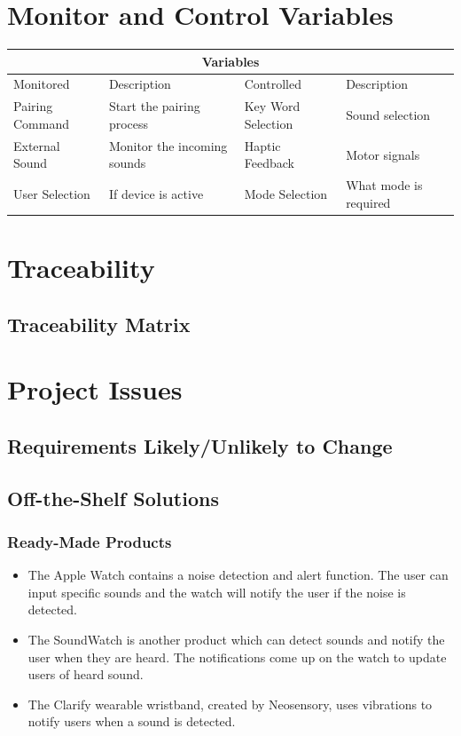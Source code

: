 \documentclass[12pt]{article}
\begin{document}
\section{Monitor and Control Variables}

\center

\begin{tabular}{|p{3cm}|p{3cm}|p{6cm}|p{3cm}| }
 \hline
 \multicolumn{4}{|c|}{Variables} \\
 \hline
 Monitored& Description & Controlled & Description\\
 \hline
 Pairing Command  &  Start the pairing process  & Key Word Selection & Sound selection  \\
 \hline
External Sound &  Monitor the incoming sounds & Haptic Feedback & Motor signals \\
\hline
User Selection & If device is active & Mode Selection & What mode is required \\
\hline


\end{tabular}

\raggedright

\section{Traceability}
 	
\subsection{Traceability Matrix}

\section{Project Issues}

\subsection{Requirements Likely/Unlikely to Change}

\subsection{Off-the-Shelf Solutions} 

\subsubsection{Ready-Made Products}
\label{readymade}
\begin{itemize}
  \item The Apple Watch contains a noise detection and alert function. The user can input specific sounds and the watch will notify the user if the noise is detected.
  \item The SoundWatch is another product which can detect sounds and notify the user when they are heard. The notifications come up on the watch to update users of heard sound.
  \item The Clarify wearable wristband, created by Neosensory, uses vibrations to notify users when a sound is detected.
\end{itemize}
\end{document}
